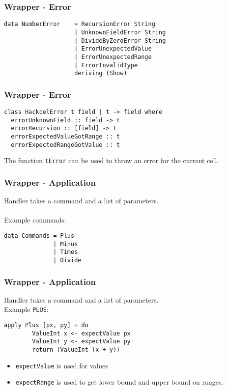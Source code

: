 \documentclass{beamer}
\begin{document}
  \begin{frame}[fragile]
  		\frametitle{Wrapper - Error}
		  		\begin{verbatim}
data NumberError    = RecursionError String
                    | UnknownFieldError String
                    | DivideByZeroError String
                    | ErrorUnexpectedValue
                    | ErrorUnexpectedRange
                    | ErrorInvalidType
                    deriving (Show)
  		\end{verbatim}
  \end{frame}
    \begin{frame}[fragile]
  		\frametitle{Wrapper - Error}
		  		\begin{verbatim}
class HackcelError t field | t -> field where
  errorUnknownField :: field -> t
  errorRecursion :: [field] -> t
  errorExpectedValueGotRange :: t
  errorExpectedRangeGotValue :: t
  		\end{verbatim}
  		The function \texttt{tError} can be used to throw an error for the current cell.
  \end{frame}
	    \begin{frame}[fragile]
  		\frametitle{Wrapper - Application}
  		Handler takes a command and a list of parameters.
  		\\\\
  		Example commands:
  		\begin{verbatim}
data Commands = Plus
              | Minus
              | Times
              | Divide        
  		\end{verbatim}
  \end{frame}  
  \begin{frame}[fragile]
  \frametitle{Wrapper - Application}
  		Handler takes a command and a list of parameters.
  		\\
  		Example \texttt{PLUS}:
  		\begin{verbatim}
apply Plus [px, py] = do
		ValueInt x <- expectValue px 
		ValueInt y <- expectValue py
		return (ValueInt (x + y))
  		\end{verbatim}
  		\begin{itemize}
  		\item \texttt{expectValue} is used for values
  		\item \texttt{expectRange} is used to get lower bound and upper bound on ranges.
  		\end{itemize}
  \end{frame}  
  
\end{document}

